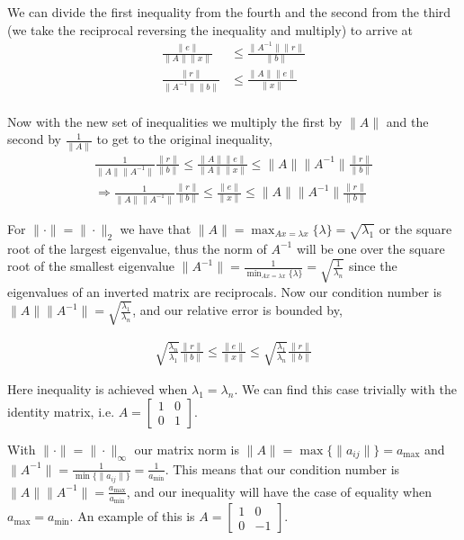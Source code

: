 {We can divide the first inequality from the fourth and the second from
the third (we take the reciprocal reversing the inequality and multiply) to arrive at
\begin{align*}
\frac{\| e \|}{\| A \| \|x \|} &\le \frac{\| A^{-1} \| \| r \|}{\| b \|} \\
\frac{\| r \|}{\| A^{-1} \| \| b \|} &\le \frac{\| A \| \| e \|}{\| x \|} \\
\end{align*}

Now with the new set of inequalities we multiply the first by $\|
A \|$ and the second by $\frac{1}{\| A\|}$ to get to the original inequality,
\begin{align*}
\frac{1} {\|A\| \|A^{-1}\|} \frac{\|r\|} {\|b\|}
\le
\frac{\|A\|\|e\|}{\| A\|\|x\|}
\le
\|A\| \|A^{-1}\| \frac{\|r\|} {\|b\|} \\
\Rightarrow \frac{1} {\|A\| \|A^{-1}\|} \frac{\|r\|} {\|b\|}
\le
\frac{\|e\|}{\|x\|}
\le
\|A\| \|A^{-1}\| \frac{\|r\|} {\|b\|}
\end{align*}

For $\| \cdot \| = \| \cdot \|_2$ we have that
$\| A \| = \max_{Ax = \lambda x} \{\lambda\} = \sqrt{\lambda_1}$ or
the square root of the largest eigenvalue, thus
the norm of $A^{-1}$ will be one over the square root of the smallest eigenvalue
$\| A^{-1} \| = \frac{1}{\min_{Ax = \lambda x} \{\lambda\}}
= \sqrt{\frac{1}{\lambda_n}}$ since the eigenvalues of an
inverted matrix are reciprocals. Now our condition number is
$ \|A\| \|A^{-1}\| = \sqrt{\frac{\lambda_1}{\lambda_n}}$, and our
relative error is bounded by,

\begin{align*}
\sqrt{\frac{\lambda_n}{\lambda_1}}
 \frac{\|r\|} {\|b\|}
\le
\frac{\|e\|}{\|x\|}
\le
\sqrt{\frac{\lambda_1}{\lambda_n}}
 \frac{\|r\|} {\|b\|}
\end{align*}

Here inequality is achieved when $\lambda_1 = \lambda_n$. We can find
this case trivially with the identity matrix, i.e.
$A = \begin{bmatrix} 1 & 0 \\ 0 & 1 \end{bmatrix}$.

With $\| \cdot \| = \| \cdot \|_{\infty}$ our matrix norm is
$\| A \| = \max\{ \|a_{ij}\| \} = a_{\max} $ and
$\| A^{-1} \| = \frac{1}{ \min\{\|a_{ij}\|\} } = \frac{1}{a_{\min}}$. This means that our
condition number is
$ \|A\| \|A^{-1}\| = \frac{a_{\max}}{a_{\min}} $, and our inequality will
have the case of equality when $a_{\max} = a_{\min}$. An example of this
is $A = \begin{bmatrix}1 & 0 \\ 0 & -1\end{bmatrix}$.

}
